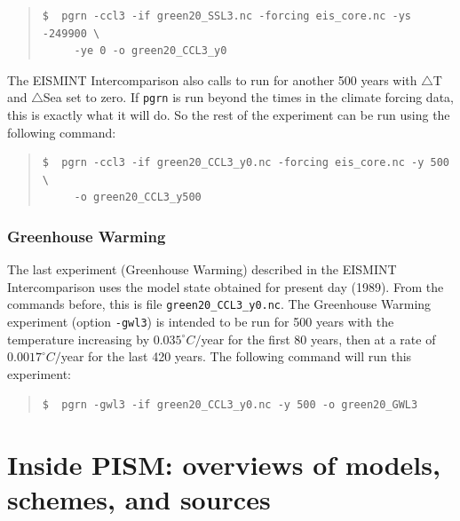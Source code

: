 \documentclass[11pt,final]{amsart}
\begin{document}
\small\begin{quote}\begin{verbatim}
$  pgrn -ccl3 -if green20_SSL3.nc -forcing eis_core.nc -ys -249900 \
     -ye 0 -o green20_CCL3_y0
\end{verbatim}
\end{quote}\normalsize

\noindent The EISMINT Intercomparison also calls to run for another 500 years with $\bigtriangleup$T and $\bigtriangleup$Sea set to zero. If \verb|pgrn| is run beyond the times in the climate forcing data, this is exactly what it will do. So the rest of the experiment can be run using the following command:

\small\begin{quote}\begin{verbatim}
$  pgrn -ccl3 -if green20_CCL3_y0.nc -forcing eis_core.nc -y 500 \
     -o green20_CCL3_y500
\end{verbatim}
\end{quote}\normalsize

\subsubsection{Greenhouse Warming}  The last experiment (Greenhouse Warming) described in the EISMINT Intercomparison uses the model state obtained for present day (1989). From the commands before, this is file \verb|green20_CCL3_y0.nc|. The Greenhouse Warming experiment (option \verb|-gwl3|) is intended to be run for 500 years with the temperature increasing by $0.035^\circ C/$year for the first 80 years, then at a rate of $0.0017^\circ C/$year for the last 420 years. The following command will run this experiment:

\small\begin{quote}\begin{verbatim}
$  pgrn -gwl3 -if green20_CCL3_y0.nc -y 500 -o green20_GWL3
\end{verbatim}
\end{quote}\normalsize


\clearpage\newpage
\section{Inside PISM: overviews of models, schemes, and sources}\label{sect:over}
\end{document}
